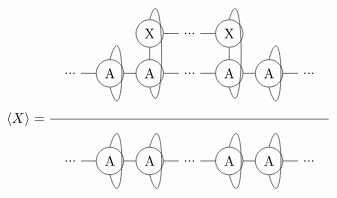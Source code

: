 \begin{equation}
    \Braket{X} = \frac{
        \begin{tikzpicture} [   ]
            \clip (-1.5,-1) rectangle (5.5,2);

            \node[] (N0) at (-1,0) {...};
            \node[circle, draw] (N1) at (0,0) {A};
            \node[circle, draw] (N2) at (1,0) {A};
            \node[circle, draw] (X2) at (1,1) {X};

            \node[] (N3) at (2 ,0) {...};
            \node[] (X3) at (2,1) {...};

            \node[circle, draw] (N4) at (3 ,0) {A};
            \node[circle, draw] (X4) at (3,1) {X};

            \node[circle, draw] (N5) at (4 ,0) {A};
            \node[] (N6) at (5 ,0) {...};

            \draw  (N0) -- (N1) ;

            \draw  (N1) -- (N2) ;
            \draw  (N2) -- (N3) ;
            \draw  (N3) -- (N4) ;
            \draw  (N4) -- (N5) ;
            \draw  (N5) -- (N6) ;

            \draw  (X2) -- (X3) ;
            \draw  (X3) -- (X4) ;

            \draw  (N2) -- (X2) ;
            \draw  (N4) -- (X4) ;

            \draw (X2.north)   .. controls +(0.4,1.4) and +(0.4,-1.4) .. (N2.south);
            \draw (X4.north)   .. controls +(0.4,1.4) and +(0.4,-1.4) .. (N4.south);

            \draw (N1.north)   .. controls +(0.4,1.4) and +(0.4,-1.4) .. (N1.south);
            \draw (N5.north)   ..  controls +(0.4,1.4) and +(0.4,-1.4)  .. (N5.south);
        \end{tikzpicture}
    }{
        \begin{tikzpicture} [   ]

            \clip  (-1.5,-3) rectangle (5.5,-1);

            \node[] (O0) at (-1,-2) {...};
            \node[circle, draw] (O1) at (0,-2) {A};
            \node[circle, draw] (O2) at (1,-2) {A};

            \node[] (O3) at (2 ,-2) {...};
            \node[circle, draw] (O4) at (3 ,-2) {A};

            \node[circle, draw] (O5) at (4 ,-2) {A};
            \node[] (O6) at (5 ,-2) {...};

            \draw  (O0) -- (O1) ;

            \draw  (O1) -- (O2) ;
            \draw  (O2) -- (O3) ;
            \draw  (O3) -- (O4) ;
            \draw  (O4) -- (O5) ;
            \draw  (O5) -- (O6) ;

            \draw (O2.north)   .. controls +(0.4,1.4) and +(0.4,-1.4) .. (O2.south);
            \draw (O4.north)   .. controls +(0.4,1.4) and +(0.4,-1.4) .. (O4.south);

            \draw (O1.north)   .. controls +(0.4,1.4) and +(0.4,-1.4) .. (O1.south);
            \draw (O5.north)   ..  controls +(0.4,1.4) and +(0.4,-1.4)  .. (O5.south);
        \end{tikzpicture}
    }
    \label{sm:expecatation_X}
\end{equation}

